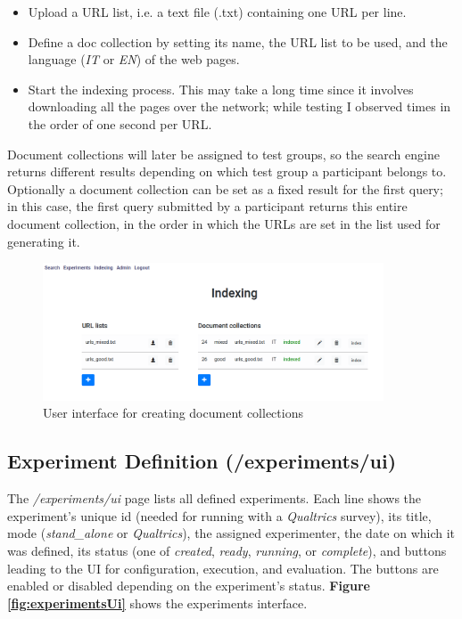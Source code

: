 \documentclass[a4paper]{usiinfbachelorproject}
\begin{document}
\begin{appendices}
\begin{itemize}
        \item Upload a URL list, i.e. a text file (.txt) containing one URL per line.

        \item Define a doc collection by setting its name, the URL list to be used, and the language (\emph{IT} or \emph{EN})
                of the web pages.

        \item Start the indexing process. This may take a long time since it involves downloading all the pages over the network;
              while testing I observed times in the order of one second per URL.

        \end{itemize}

        Document collections will later be assigned 
        to test groups, so the search engine returns different results depending on which test group a participant belongs to. Optionally
        a document collection can be set as a fixed result for the first query; in this case, the first query submitted by a
        participant returns this entire document collection, in the order in which the URLs are set in the list used for generating it.

        \begin{figure} [h]
        \centering
        \includegraphics[width=0.9\textwidth]{figures/indexingUi}
        \caption[]{User interface for creating document collections}
        \label{fig:indexingUi}
        \end{figure}

        \newpage


        \subsection{Experiment Definition \small{(/experiments/ui)}}

        The \emph{/experiments/ui} page lists all defined experiments. Each line shows the experiment's unique id (needed for running
        with a \emph{Qualtrics} survey), its title, mode (\emph{stand\_alone} or \emph{Qualtrics}), the assigned experimenter, the date on which it was defined, 
        its status (one of \emph{created}, \emph{ready}, \emph{running}, or \emph{complete}), and buttons leading to the UI for configuration,
        execution, and evaluation. The buttons are enabled or disabled depending on the experiment's status. \textbf{Figure \ref{fig:experimentsUi}}
        shows the experiments interface.


\end{appendices}
\end{document}

